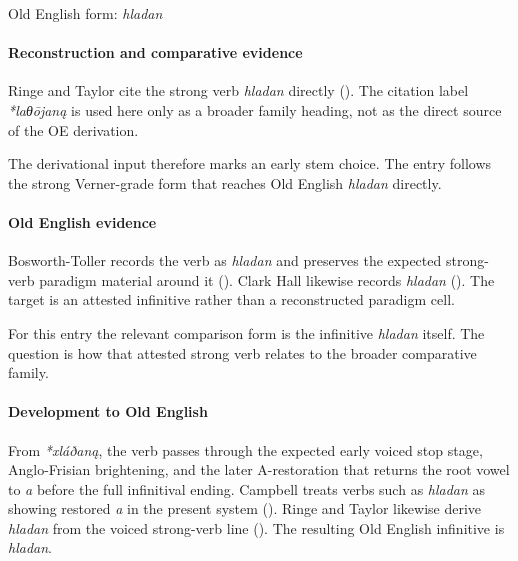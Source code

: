 \documentclass[
  british,
  a4paper,
]{article}
\begin{document}
Old English form: \emph{hladan}

\paragraph{Reconstruction and comparative
evidence}\label{reconstruction-and-comparative-evidence-14}

Ringe and Taylor cite the strong verb \emph{hladan} directly
(). The
citation label \emph{*laθōjaną} is used here only as a broader family
heading, not as the direct source of the OE derivation.

The derivational input therefore marks an early stem choice. The entry
follows the strong Verner-grade form that reaches Old English
\emph{hladan} directly.

\paragraph{Old English evidence}\label{old-english-evidence-14}

Bosworth-Toller records the verb as \emph{hladan} and preserves the
expected strong-verb paradigm material around it
().
Clark Hall likewise records \emph{hladan}
(). The target is an
attested infinitive rather than a reconstructed paradigm cell.

For this entry the relevant comparison form is the infinitive
\emph{hladan} itself. The question is how that attested strong verb
relates to the broader comparative family.

\paragraph{Development to Old
English}\label{development-to-old-english-14}

From \emph{*xláðaną}, the verb passes through the expected early voiced
stop stage, Anglo-Frisian brightening, and the later A-restoration that
returns the root vowel to \emph{a} before the full infinitival ending.
Campbell treats verbs such as \emph{hladan} as showing restored \emph{a}
in the present system (). Ringe and Taylor likewise derive \emph{hladan} from the voiced
strong-verb line (). The resulting Old English infinitive is \emph{hladan}.
\end{document}
